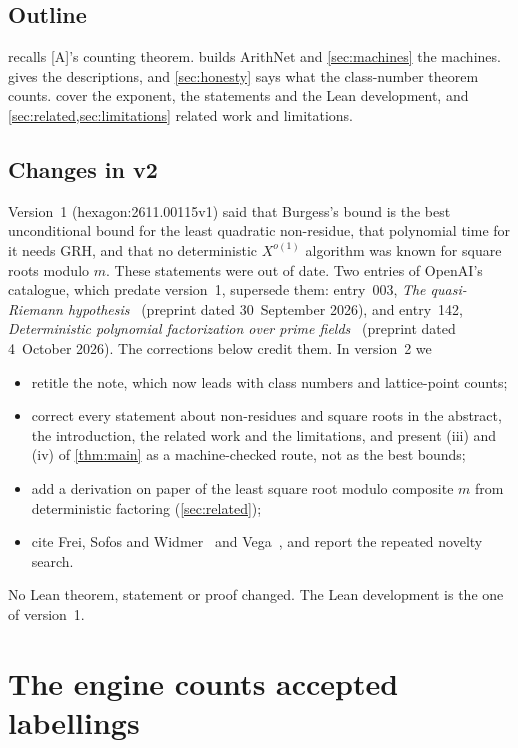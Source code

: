 \documentclass[10pt]{amsart}
\theoremstyle{plain}
\theoremstyle{definition}
\theoremstyle{remark}
\numberwithin{equation}{section}
\newcommand{\A}{\textup{[A]}}
\begin{document}
\subsection*{Outline}
 recalls \A's counting theorem.  builds ArithNet and
\cref{sec:machines} the machines.  gives the descriptions, and \cref{sec:honesty}
says what the class-number theorem counts.  cover the exponent,
the statements and the Lean development, and \cref{sec:related,sec:limitations} related work and
limitations.

\subsection*{Changes in v2}
Version~1 (hexagon:2611.00115v1) said that Burgess's bound is the best unconditional bound for the least
quadratic non-residue, that polynomial time for it needs GRH, and that no deterministic $X^{o(1)}$
algorithm was known for square roots modulo $m$. These statements were out of date. Two entries of
OpenAI's catalogue, which predate version~1, supersede them: entry~003, \emph{The quasi-Riemann
hypothesis}~\cite{OAI003} (preprint dated 30~September 2026), and entry~142, \emph{Deterministic polynomial
factorization over prime fields}~\cite{OAI142} (preprint dated 4~October 2026). The corrections below credit
them. In version~2 we
\begin{itemize}
\item retitle the note, which now leads with class numbers and lattice-point counts;
\item correct every statement about non-residues and square roots in the abstract, the introduction, the
related work and the limitations, and present (iii) and (iv) of \cref{thm:main} as a machine-checked
route, not as the best bounds;
\item add a derivation on paper of the least square root modulo composite $m$ from deterministic
factoring (\cref{sec:related});
\item cite Frei, Sofos and Widmer~\cite{FSW26} and Vega~\cite{Vega26}, and report the repeated novelty
search.
\end{itemize}
No Lean theorem, statement or proof changed. The Lean development is the one of version~1.

\section{The engine counts accepted labellings}\label{sec:engine}
\end{document}
